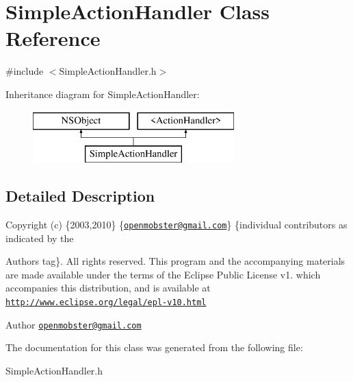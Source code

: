 \hypertarget{interface_simple_action_handler}{
\section{\-Simple\-Action\-Handler \-Class \-Reference}
\label{interface_simple_action_handler}
}


{\ttfamily \#include $<$\-Simple\-Action\-Handler.\-h$>$}

\-Inheritance diagram for \-Simple\-Action\-Handler\-:\begin{figure}[H]
\begin{center}
\leavevmode
\includegraphics[height=2.000000cm]{interface_simple_action_handler}
\end{center}
\end{figure}


\subsection{\-Detailed \-Description}
\-Copyright (c) \{2003,2010\} \{\href{mailto:openmobster@gmail.com}{\tt openmobster@gmail.\-com}\} \{individual contributors as indicated by the \begin{DoxyAuthor}{\-Authors}
tag\}. \-All rights reserved. \-This program and the accompanying materials are made available under the terms of the \-Eclipse \-Public \-License v1. which accompanies this distribution, and is available at \href{http://www.eclipse.org/legal/epl-v10.html}{\tt http\-://www.\-eclipse.\-org/legal/epl-\/v10.\-html}
\end{DoxyAuthor}
\begin{DoxyAuthor}{\-Author}
\href{mailto:openmobster@gmail.com}{\tt openmobster@gmail.\-com} 
\end{DoxyAuthor}


\-The documentation for this class was generated from the following file\-:\begin{DoxyCompactItemize}
\item 
\-Simple\-Action\-Handler.\-h\end{DoxyCompactItemize}
